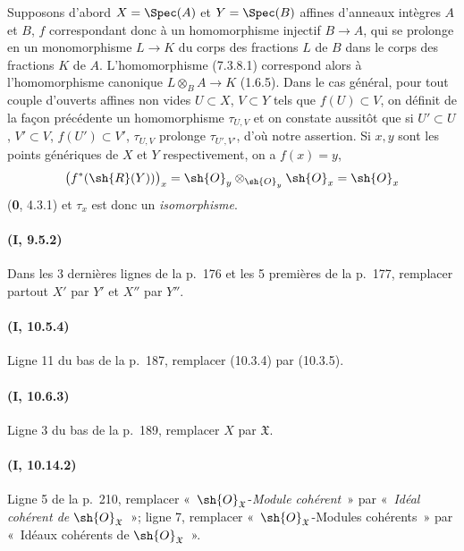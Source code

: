 Supposons d'abord $X=\Spec(A)$ et $Y=\Spec(B)$ affines d'anneaux
intègres $A$ et $B$, $f$ correspondant donc à un homomorphisme injectif
$B\to A$, qui se prolonge en un monomorphisme $L\to K$ du corps des
fractions $L$ de $B$ dans le corps des fractions $K$ de $A$.
L'homomorphisme (7.3.8.1) correspond alors à l'homomorphisme canonique
$L\otimes_B A\to K$
(1.6.5). Dans le cas général, pour tout couple d'ouverts affines non
vides $U\subset X$, $V\subset Y$ tels que $f(U)\subset V$, on définit
de la façon précédente un homomorphisme $\tau_{U,V}$ et on constate
aussitôt que si $U'\subset U$, $V'\subset V$,
$f(U')\subset V'$, $\tau_{U,V}$ prolonge $\tau_{U',V'}$, d'où notre
assertion. Si $x,y$ sont les points génériques de $X$ et $Y$
respectivement, on a $f(x)=y$,
\[
  \bigl(f^*(\sh{R}(Y))\bigr)_x
  =\sh{O}_y\otimes_{\sh{O}_y}\sh{O}_x
  =\sh{O}_x
\]
(\textbf{0}, 4.3.1) et $\tau_x$ est donc un \emph{isomorphisme}.

\paragraph{(I, 9.5.2)}
Dans les 3 dernières lignes de la p.~176 et les 5 premières de la
p.~177, remplacer partout $X'$ par $Y'$ et $X''$ par $Y''$.

\paragraph{(I, 10.5.4)}
Ligne 11 du bas de la p.~187, remplacer (10.3.4) par (10.3.5).

\paragraph{(I, 10.6.3)}
Ligne 3 du bas de la p.~189, remplacer $X$ par $\mathfrak X$.

\paragraph{(I, 10.14.2)}
Ligne 5 de la p.~210, remplacer «~$\sh{O}_{\mathfrak X}$-\emph{Module cohérent}~» par
«~\emph{Idéal cohérent de} $\sh{O}_{\mathfrak X}$~»; ligne 7, remplacer
«~$\sh{O}_{\mathfrak X}$-Modules cohérents~» par «~Idéaux cohérents de
$\sh{O}_{\mathfrak X}$~».
